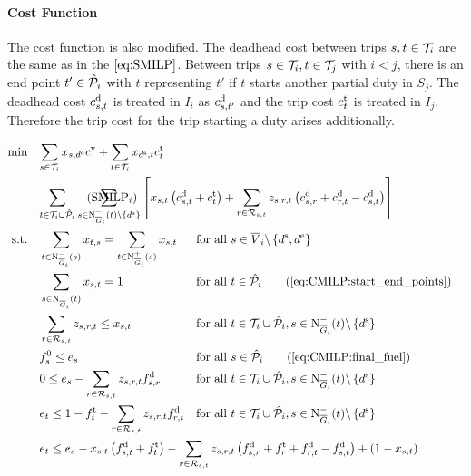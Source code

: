 \paragraph{Cost Function} \parfill

The cost function is also modified. The deadhead cost between trips ${s,t\in\mathcal{T}_i}$ are the same as in the $\eqref{eq:SMILP}$. Between trips ${s\in\mathcal{T}_i}, {t\in\mathcal{T}_j}$ with ${i<j}$, there is an end point ${t'\in\hat{\mathcal{P}}_i}$ with $t$ representing $t'$ if $t$ starts another partial duty in $S_j$. The deadhead cost $c^{\operatorname{d}}_{s,t}$ is treated in $I_i$ as $c^{\operatorname{d}}_{s,t'}$ and the trip cost $c^{\operatorname{t}}_t$ is treated in $I_j$. Therefore the trip cost for the trip starting a duty arises additionally.

\newpage

\begin{align}
	\min \quad & \omit\rlap{$\displaystyle{\sum_{s\in\Ti} x_{s,\de}\cv + \sum_{t\in\Ti} x_{\ds, t}\ct_t}$} \nonumber \\
	& \omit\rlap{$\displaystyle{\sum_{t\in\Ti\cup\Phat_i}\sum_{s\in\Ninoi(t)\backslash\left\{\ds\right\}}\left[x_{s,t}\left(\cd_{s,t}+\ct_t\right)+\sum_{r\in\Rst}z_{s,r,t}\left(\cd_{s,r}+\cd_{r,t}-\cd_{s,t}\right)\right]}$} \tag{$\operatorname{SMILP}_i$} \label{eq:SMILPi} \\
	\text{s.t.} \quad & \sum_{t\in\Ninoi(s)} x_{t,s} = \sum_{t\in\Noutoi(s)} x_{s,t} & & \text{for all } s\in \overline{V}_i\backslash\left\{\ds,\de\right\} \label{eq:CMILP:flow} \\
	& \sum_{s\in\Ninoi(t)} x_{s,t} = 1 && \text{for all } t\in\Phat_i \tag{\ref{eq:CMILP:start_end_points}} \\	
	& \sum_{r\in\Rst} z_{s,r,t} \leq x_{s,t} && \text{for all } t\in\Ti\cup\Phat_i, s\in\Ninoi(t)\backslash\left\{\ds\right\} \label{eq:CMILP:refuel} \\
	& f^0_s \leq e_s && \text{for all } s\in\Phat_i \tag{\ref{eq:CMILP:final_fuel}} \\
	& 0 \leq e_s - \sum_{r\in\Rst} z_{s,r,t}\fd_{s,r} & & \text{for all } t\in\Ti\cup\Phat_i, s\in\Ninoi(t)\backslash\left\{\ds\right\} \label{eq:CMILP:min_fuel} \\
	& e_t \leq 1 - \ft_t - \sum_{r\in\Rst} z_{s,r,t}\fd_{r,t} & & \text{for all } t\in\Ti\cup\Phat_i, s\in\Ninoi(t)\backslash\left\{\ds\right\} \label{eq:CMILP:max_fuel} \\
	& \omit\rlap{$\displaystyle{e_t \leq e_s - x_{s,t}\left(f_{s,t}^{\operatorname{d}}+f_t^{\operatorname{t}}\right) - \sum_{r\in\Rst} z_{s,r,t}\left(\fd_{s,r}+\ft_r+\fd_{r,t}-\fd_{s,t}\right) + \left(1-x_{s,t}\right)}$} \nonumber \\

\end{align}
